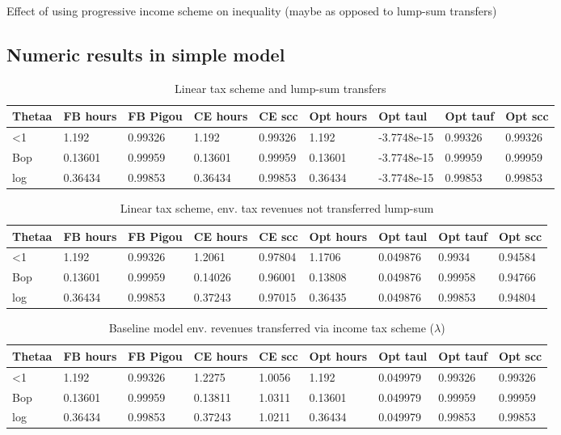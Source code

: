 \begin{prop}
Effect of using progressive income scheme on inequality (maybe as opposed to lump-sum transfers)
\end{prop}

\subsection{Numeric results in simple model}
\begin{table}[h!!]
	\caption{Linear tax scheme and lump-sum transfers}\label{tab:lin_lst}
	\begin{tabular}{lllllllll}
		Thetaa & FB hours & FB Pigou & CE hours & CE scc & Opt hours & Opt taul & Opt tauf & Opt scc \\ 
		\hline 
		<1 & 1.192 & 0.99326 & 1.192 & 0.99326 & 1.192 & -3.7748e-15 & 0.99326 & 0.99326 \\ 
		Bop & 0.13601 & 0.99959 & 0.13601 & 0.99959 & 0.13601 & -3.7748e-15 & 0.99959 & 0.99959 \\ 
		log & 0.36434 & 0.99853 & 0.36434 & 0.99853 & 0.36434 & -3.7748e-15 & 0.99853 & 0.99853 \\ 
		\hline 
	\end{tabular}
\end{table}
\begin{table}
	\caption{Linear tax scheme, env. tax revenues not transferred lump-sum}\label{tab:lin_nolst}
	\begin{tabular}{lllllllll}
		Thetaa & FB hours & FB Pigou & CE hours & CE scc & Opt hours & Opt taul & Opt tauf & Opt scc \\ 
		\hline 
		<1 & 1.192 & 0.99326 & 1.2061 & 0.97804 & 1.1706 & 0.049876 & 0.9934 & 0.94584 \\ 
		Bop & 0.13601 & 0.99959 & 0.14026 & 0.96001 & 0.13808 & 0.049876 & 0.99958 & 0.94766 \\ 
		log & 0.36434 & 0.99853 & 0.37243 & 0.97015 & 0.36435 & 0.049876 & 0.99853 & 0.94804 \\ 
		\hline 
	\end{tabular}
\end{table}
\begin{table}[h!!]
	\caption{Baseline model env. revenues transferred via income tax scheme ($\lambda$)}\label{tab:base}
	\begin{tabular}{lllllllll}
		Thetaa & FB hours & FB Pigou & CE hours & CE scc & Opt hours & Opt taul & Opt tauf & Opt scc \\ 
		\hline 
		<1 & 1.192 & 0.99326 & 1.2275 & 1.0056 & 1.192 & 0.049979 & 0.99326 & 0.99326 \\ 
		Bop & 0.13601 & 0.99959 & 0.13811 & 1.0311 & 0.13601 & 0.049979 & 0.99959 & 0.99959 \\ 
		log & 0.36434 & 0.99853 & 0.37243 & 1.0211 & 0.36434 & 0.049979 & 0.99853 & 0.99853 \\ 
		\hline 
	\end{tabular}
\end{table}



